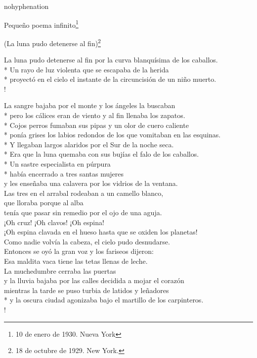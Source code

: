 \documentclass[
    a5paper,
    DIV=10,
    12pt,
    notitlepage,
    oneside,]
{scrbook} %
\begin{document}
\begin{hyphenrules}{nohyphenation}
\begin{poem}{Pequeño poema infinito}{\footnote{10 de enero de 1930. Nueva York}}{\vspace{-1em}}
\end{poem}

\begin{poem}{(La luna pudo detenerse al fin)}{\footnote{18 de octubre de 1929. New York.}}{}

La luna pudo detenerse al fin por la curva blanquísima de los caballos.\\*
Un rayo de luz violenta que se escapaba de la herida\\*
proyectó en el cielo el instante de la circuncisión de un niño muerto.\\!

La sangre bajaba por el monte y los ángeles la buscaban\\*
pero los cálices eran de viento y al fin llenaba los zapatos.\\*
Cojos perros fumaban sus pipas y un olor de cuero caliente\\*
ponía grises los labios redondos de los que vomitaban en las esquinas.\\*
Y llegaban largos alaridos por el Sur de la noche seca.\\*
Era que la luna quemaba con sus bujías el falo de los caballos.\\*
Un sastre especialista en púrpura\\*
había encerrado a tres santas mujeres\\
y les enseñaba una calavera por los vidrios de la ventana.\\
Las tres en el arrabal rodeaban a un camello blanco,\\
que lloraba porque al alba\\
tenía que pasar sin remedio por el ojo de una aguja.\\
¡Oh cruz! ¡Oh clavos! ¡Oh espina!\\
¡Oh espina clavada en el hueso hasta que se oxiden los planetas!\\
Como nadie volvía la cabeza, el cielo pudo desnudarse.\\
Entonces se oyó la gran voz y los fariseos dijeron:\\
Esa maldita vaca tiene las tetas llenas de leche.\\
La muchedumbre cerraba las puertas\\
y la lluvia bajaba por las calles decidida a mojar el corazón\\
mientras la tarde se puso turbia de latidos y leñadores\\*
y la oscura ciudad agonizaba bajo el martillo de los carpinteros.\\!


\end{poem}
\end{hyphenrules}
\end{document}
